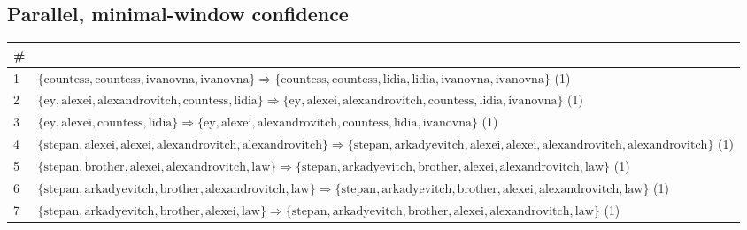 \begin{appendices}
\section{Parallel, minimal-window confidence}
\label{appendix:rules-par-mwi}

\begin{longtable}{p{20pt}|p{\dimexpr\textwidth-20pt-\tabcolsep\relax}}
\# & \\
\hline
1 & $ \{ \text{countess},\allowbreak\text{countess},\allowbreak\text{ivanovna},\allowbreak\text{ivanovna} \} \Rightarrow \{ \text{countess},\allowbreak\text{countess},\allowbreak\text{lidia},\allowbreak\text{lidia},\allowbreak\text{ivanovna},\allowbreak\text{ivanovna} \} $ (1) \\
2 & $ \{ \text{ey},\allowbreak\text{alexei},\allowbreak\text{alexandrovitch},\allowbreak\text{countess},\allowbreak\text{lidia} \} \Rightarrow \{ \text{ey},\allowbreak\text{alexei},\allowbreak\text{alexandrovitch},\allowbreak\text{countess},\allowbreak\text{lidia},\allowbreak\text{ivanovna} \} $ (1) \\
3 & $ \{ \text{ey},\allowbreak\text{alexei},\allowbreak\text{countess},\allowbreak\text{lidia} \} \Rightarrow \{ \text{ey},\allowbreak\text{alexei},\allowbreak\text{alexandrovitch},\allowbreak\text{countess},\allowbreak\text{lidia},\allowbreak\text{ivanovna} \} $ (1) \\
4 & $ \{ \text{stepan},\allowbreak\text{alexei},\allowbreak\text{alexei},\allowbreak\text{alexandrovitch},\allowbreak\text{alexandrovitch} \} \Rightarrow \{ \text{stepan},\allowbreak\text{arkadyevitch},\allowbreak\text{alexei},\allowbreak\text{alexei},\allowbreak\text{alexandrovitch},\allowbreak\text{alexandrovitch} \} $ (1) \\
5 & $ \{ \text{stepan},\allowbreak\text{brother},\allowbreak\text{alexei},\allowbreak\text{alexandrovitch},\allowbreak\text{law} \} \Rightarrow \{ \text{stepan},\allowbreak\text{arkadyevitch},\allowbreak\text{brother},\allowbreak\text{alexei},\allowbreak\text{alexandrovitch},\allowbreak\text{law} \} $ (1) \\
6 & $ \{ \text{stepan},\allowbreak\text{arkadyevitch},\allowbreak\text{brother},\allowbreak\text{alexandrovitch},\allowbreak\text{law} \} \Rightarrow \{ \text{stepan},\allowbreak\text{arkadyevitch},\allowbreak\text{brother},\allowbreak\text{alexei},\allowbreak\text{alexandrovitch},\allowbreak\text{law} \} $ (1) \\
7 & $ \{ \text{stepan},\allowbreak\text{arkadyevitch},\allowbreak\text{brother},\allowbreak\text{alexei},\allowbreak\text{law} \} \Rightarrow \{ \text{stepan},\allowbreak\text{arkadyevitch},\allowbreak\text{brother},\allowbreak\text{alexei},\allowbreak\text{alexandrovitch},\allowbreak\text{law} \} $ (1) \\

\end{longtable}
\end{appendices}
